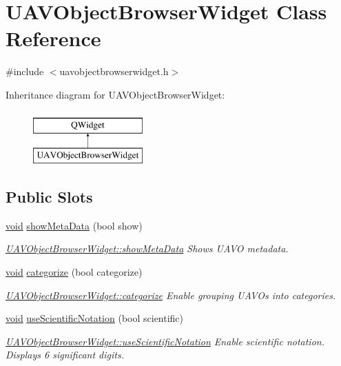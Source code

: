 \hypertarget{class_u_a_v_object_browser_widget}{\section{U\-A\-V\-Object\-Browser\-Widget Class Reference}
\label{class_u_a_v_object_browser_widget}
}


{\ttfamily \#include $<$uavobjectbrowserwidget.\-h$>$}

Inheritance diagram for U\-A\-V\-Object\-Browser\-Widget\-:\begin{figure}[H]
\begin{center}
\leavevmode
\includegraphics[height=2.000000cm]{class_u_a_v_object_browser_widget}
\end{center}
\end{figure}
\subsection*{Public Slots}
\begin{DoxyCompactItemize}
\item 
\hyperlink{group___u_a_v_objects_plugin_ga444cf2ff3f0ecbe028adce838d373f5c}{void} \hyperlink{group___u_a_v_object_browser_plugin_ga96e35f04d563b34d393bcd810423910d}{show\-Meta\-Data} (bool show)
\begin{DoxyCompactList}\small\item\em \hyperlink{group___u_a_v_object_browser_plugin_ga96e35f04d563b34d393bcd810423910d}{U\-A\-V\-Object\-Browser\-Widget\-::show\-Meta\-Data} Shows U\-A\-V\-O metadata. \end{DoxyCompactList}\item 
\hyperlink{group___u_a_v_objects_plugin_ga444cf2ff3f0ecbe028adce838d373f5c}{void} \hyperlink{group___u_a_v_object_browser_plugin_gaf58df81be827bdbeed97dcb96dcfbb6a}{categorize} (bool categorize)
\begin{DoxyCompactList}\small\item\em \hyperlink{group___u_a_v_object_browser_plugin_gaf58df81be827bdbeed97dcb96dcfbb6a}{U\-A\-V\-Object\-Browser\-Widget\-::categorize} Enable grouping U\-A\-V\-Os into categories. \end{DoxyCompactList}\item 
\hyperlink{group___u_a_v_objects_plugin_ga444cf2ff3f0ecbe028adce838d373f5c}{void} \hyperlink{group___u_a_v_object_browser_plugin_gaf9528641294317e651ef6e23f6e11946}{use\-Scientific\-Notation} (bool scientific)
\begin{DoxyCompactList}\small\item\em \hyperlink{group___u_a_v_object_browser_plugin_gaf9528641294317e651ef6e23f6e11946}{U\-A\-V\-Object\-Browser\-Widget\-::use\-Scientific\-Notation} Enable scientific notation. Displays 6 significant digits. \end{DoxyCompactList}\end{DoxyCompactItemize}
